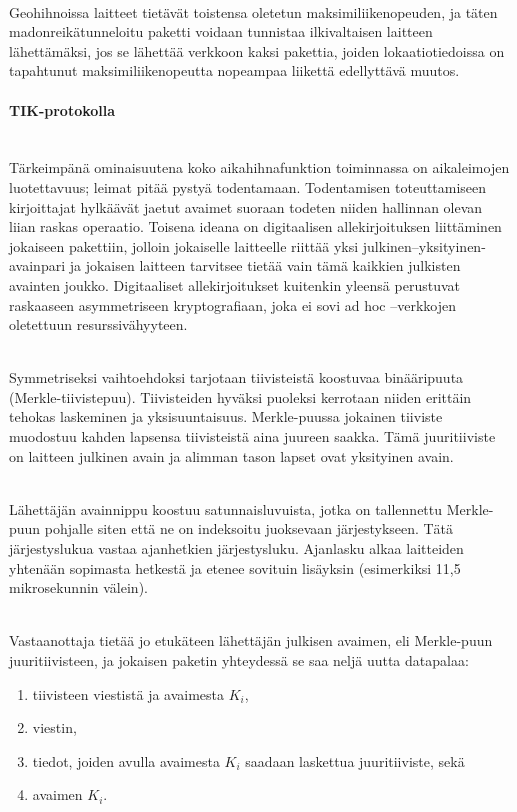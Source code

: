\documentclass[finnish]{tktltiki2}
\theoremstyle{definition}
\theoremstyle{remark}
\begin{document}
\noindent \\
Geohihnoissa laitteet tietävät toistensa oletetun maksimiliikenopeuden, ja täten madonreikätunneloitu paketti voidaan tunnistaa ilkivaltaisen laitteen lähettämäksi, jos se lähettää verkkoon kaksi pakettia, joiden lokaatiotiedoissa on tapahtunut maksimiliikenopeutta nopeampaa liikettä edellyttävä muutos.

\paragraph{TIK-protokolla} 
\noindent \\
Tärkeimpänä ominaisuutena koko aikahihnafunktion toiminnassa on aikaleimojen luotettavuus; leimat pitää pystyä todentamaan. Todentamisen toteuttamiseen kirjoittajat hylkäävät jaetut avaimet suoraan todeten niiden hallinnan olevan liian raskas operaatio. Toisena ideana on digitaalisen allekirjoituksen liittäminen jokaiseen pakettiin, jolloin jokaiselle laitteelle riittää yksi julkinen--yksityinen-avainpari ja jokaisen laitteen tarvitsee tietää vain tämä kaikkien julkisten avainten joukko. Digitaaliset allekirjoitukset kuitenkin yleensä perustuvat raskaaseen asymmetriseen kryptografiaan, joka ei sovi ad hoc –verkkojen oletettuun resurssivähyyteen.

\noindent \\
Symmetriseksi vaihtoehdoksi tarjotaan tiivisteistä koostuvaa binääripuuta (Merkle-tiivistepuu). Tiivisteiden hyväksi puoleksi kerrotaan niiden erittäin tehokas laskeminen ja yksisuuntaisuus. Merkle-puussa jokainen tiiviste muodostuu kahden lapsensa tiivisteistä aina juureen saakka. Tämä juuritiiviste on laitteen julkinen avain ja alimman tason lapset ovat yksityinen avain.

\noindent \\
Lähettäjän avainnippu koostuu satunnaisluvuista, jotka on tallennettu Merkle-puun pohjalle siten että ne on indeksoitu juoksevaan järjestykseen. Tätä järjestyslukua vastaa ajanhetkien järjestysluku. Ajanlasku alkaa laitteiden yhtenään sopimasta hetkestä ja etenee sovituin lisäyksin (esimerkiksi 11,5 mikrosekunnin välein). 

\noindent \\
Vastaanottaja tietää jo etukäteen lähettäjän julkisen avaimen, eli Merkle-puun juuritiivisteen, ja jokaisen paketin yhteydessä se saa neljä uutta datapalaa:

\begin{enumerate}
\item tiivisteen viestistä ja avaimesta $K_i$,
\item viestin,
\item tiedot, joiden avulla avaimesta $K_i$ saadaan laskettua juuritiiviste, sekä
\item avaimen $K_i$.
\end{enumerate}
\end{document}
